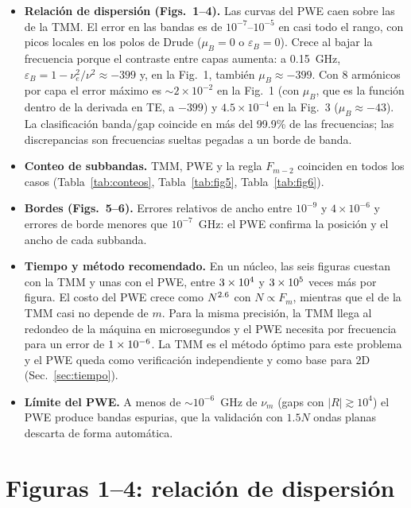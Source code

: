 \documentclass[11pt,a4paper]{article}
\begin{document}
\begin{itemize}
\item \textbf{Relación de dispersión (Figs.~1--4).} Las curvas del PWE caen sobre
las de la TMM. El error en las bandas es de $10^{-7}$--$10^{-5}$ en casi todo el
rango, con picos locales en los polos de Drude ($\mu_B=0$ o $\varepsilon_B=0$).
Crece al bajar la frecuencia porque el contraste entre capas aumenta: a
0.15~GHz, $\varepsilon_B=1-\nu_e^2/\nu^2\approx-399$ y, en la Fig.~1,
también $\mu_B\approx-399$. Con 8 armónicos por capa el error máximo es
$\sim\!2\times10^{-2}$ en la Fig.~1 (con $\mu_B$, que es la función dentro de la
derivada en TE, a $-399$) y $4.5\times10^{-4}$ en la Fig.~3 ($\mu_B\approx-43$). La
clasificación banda/gap coincide en más del 99.9\% de las frecuencias; las
discrepancias son frecuencias sueltas pegadas a un borde de banda.
\item \textbf{Conteo de subbandas.} TMM, PWE y la regla $F_{m-2}$ coinciden en
todos los casos (Tabla~\ref{tab:conteos}, Tabla~\ref{tab:fig5}, Tabla~\ref{tab:fig6}).
\item \textbf{Bordes (Figs.~5--6).} Errores relativos de ancho entre $10^{-9}$ y
$4\times10^{-6}$ y errores de borde menores que $10^{-7}$~GHz: el PWE confirma la posición y el ancho de cada subbanda.
\item \textbf{Tiempo y método recomendado.} En un núcleo, las seis figuras cuestan
\EffFigTmmTotal{} con la TMM y unas \EffFigPweTotal{} con el PWE, entre
$3\times10^{4}$ y $3\times10^{5}$ veces más por figura. El costo del PWE crece
como $N^{2.6}$ con $N\propto F_m$, mientras que el de la TMM casi no
depende de $m$. Para la misma precisión, la TMM llega al redondeo de la máquina en
microsegundos y el PWE necesita \EffWpBestTime{} por frecuencia para un error de
$1\times10^{-6}$. La TMM es el método óptimo para este problema y el PWE queda
como verificación independiente y como base para 2D (Sec.~\ref{sec:tiempo}).
\item \textbf{Límite del PWE.} A menos de $\sim\!10^{-6}$~GHz de $\nu_m$ (gaps con
$|R|\gtrsim10^4$) el PWE produce bandas espurias, que la validación con
$1.5N$ ondas planas descarta de forma automática.
\end{itemize}

\section{Figuras 1--4: relación de dispersión}
\end{document}
